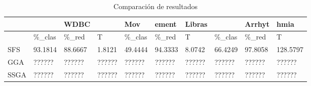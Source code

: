 \begin{table}[H]
	\centering
	\small
	\begin{tabular}{l|lll|lll|lll}
				& 			& WDBC 		&			&	  Mov	& ement 	& Libras	&			& Arrhyt	& hmia		\\ \hline
				& \%\_clas	& \%\_red	& T			& \%\_clas	& \%\_red	& T			& \%\_clas	& \%\_red	& T			\\ \hline
		SFS		& 93.1814	& 88.6667	& 1.8121	& 49.4444	& 94.3333	& 8.0742	& 66.4249	& 97.8058	& 128.5797 	\\ \hline
		GGA		& ??????	& ??????	& ??????	& ??????	& ??????	& ??????	& ??????	& ??????	& ??????	\\ \hline
		SSGA	& ??????	& ??????	& ??????	& ??????	& ??????	& ??????	& ??????	& ??????	& ??????
		
	\end{tabular}
	\caption{Comparación de resultados}
	\label{Compare}
\end{table}